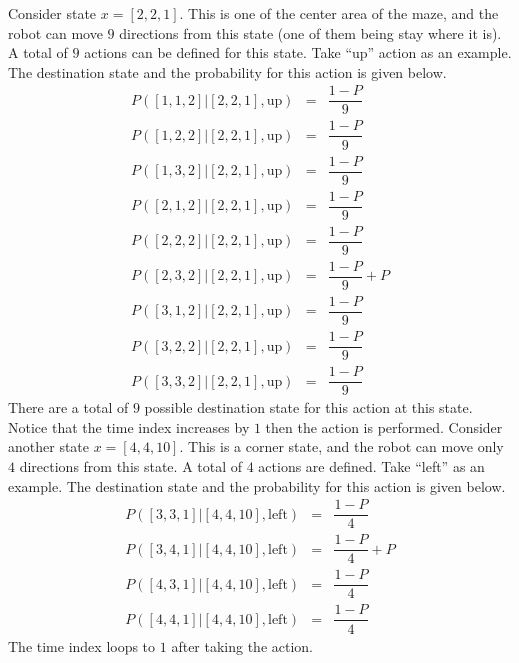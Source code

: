 Consider state $x=[2,2,1]$. This is one of the center area of the maze, and the robot can move $9$ directions from this state (one of them being stay where it is). A total of $9$ actions can be defined for this state. Take ``up'' action as an example. The destination state and the probability for this action is given below.
\begin{eqnarray}
	P\left([1,1,2]|[2,2,1], \mathrm{up}\right) &=& \dfrac{1-P}{9} \nonumber \\
	P\left([1,2,2]|[2,2,1], \mathrm{up}\right) &=& \dfrac{1-P}{9} \nonumber \\
	P\left([1,3,2]|[2,2,1], \mathrm{up}\right) &=& \dfrac{1-P}{9} \nonumber \\
	P\left([2,1,2]|[2,2,1], \mathrm{up}\right) &=& \dfrac{1-P}{9} \nonumber \\
	P\left([2,2,2]|[2,2,1], \mathrm{up}\right) &=& \dfrac{1-P}{9} \nonumber \\
	P\left([2,3,2]|[2,2,1], \mathrm{up}\right) &=& \dfrac{1-P}{9} + P \nonumber \\
	P\left([3,1,2]|[2,2,1], \mathrm{up}\right) &=& \dfrac{1-P}{9} \nonumber \\
	P\left([3,2,2]|[2,2,1], \mathrm{up}\right) &=& \dfrac{1-P}{9} \nonumber \\
	P\left([3,3,2]|[2,2,1], \mathrm{up}\right) &=& \dfrac{1-P}{9} \nonumber
\end{eqnarray} 
There are a total of $9$ possible destination state for this action at this state. Notice that the time index increases by $1$ then the action is performed. Consider another state $x=[4,4,10]$. This is a corner state, and the robot can move only $4$ directions from this state. A total of $4$ actions are defined. Take ``left'' as an example. The destination state and the probability for this action is given below.
\begin{eqnarray}
	P\left([3,3,1]|[4,4,10], \mathrm{left}\right) &=& \dfrac{1-P}{4} \nonumber \\
	P\left([3,4,1]|[4,4,10], \mathrm{left}\right) &=& \dfrac{1-P}{4} + P \nonumber \\
	P\left([4,3,1]|[4,4,10], \mathrm{left}\right) &=& \dfrac{1-P}{4} \nonumber \\
	P\left([4,4,1]|[4,4,10], \mathrm{left}\right) &=& \dfrac{1-P}{4} \nonumber
\end{eqnarray} 
The time index loops to $1$ after taking the action.

